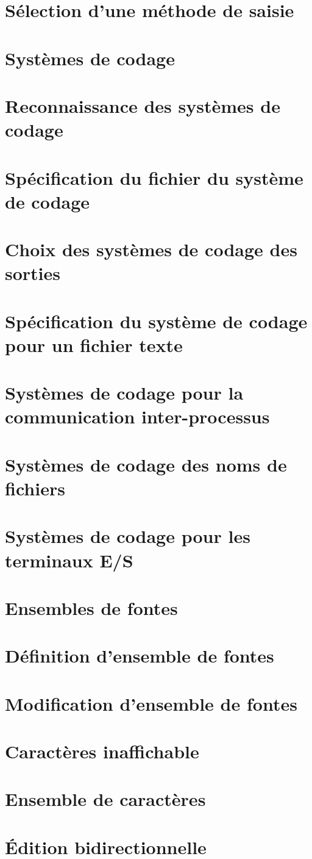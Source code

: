 \section{Sélection d'une méthode de saisie}
\section{Systèmes de codage}
\section{Reconnaissance des systèmes de codage}
\section{Spécification du fichier du système de codage}
\section{Choix des systèmes de codage des sorties}
\section{Spécification du système de codage pour un fichier
  texte} 
\section{Systèmes de codage pour la communication
  inter-processus} 
\section{Systèmes de codage des noms de fichiers}
\section{Systèmes de codage pour les terminaux E/S}
\section{Ensembles de fontes}
\section{Définition d'ensemble de fontes}
\section{Modification d'ensemble de fontes}
\section{Caractères inaffichable}
\section{Ensemble de caractères}
\section{\'Edition bidirectionnelle}
